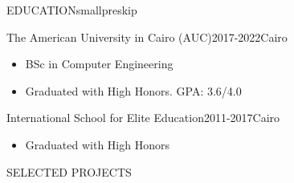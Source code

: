 \documentclass{resume}
\begin{document}
\begin{minipage}[t]{0.54\textwidth}

	\begin{rsection}{\MakeUppercase{education}}{smallpreskip}

		\begin{rcontent}{The American University in Cairo (AUC)}{2017-2022}{Cairo}
			\begin{itemize}
				\item BSc in Computer Engineering
				\item Graduated with High Honors. GPA: 3.6/4.0
			\end{itemize}
		\end{rcontent}
		\divider
		\begin{rcontent}{International School for Elite Education}{2011-2017}{Cairo}
			\begin{itemize}
				\item Graduated with High Honors
			\end{itemize}
		\end{rcontent}

	\end{rsection}

	\begin{rsection}{\MakeUppercase{selected projects}}{}


\end{rsection}
\end{minipage}
\end{document}
